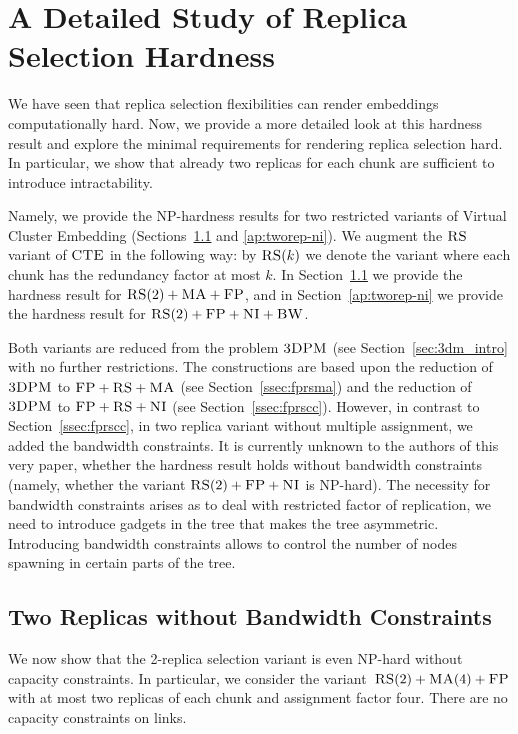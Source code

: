 \section{A Detailed Study of Replica Selection Hardness}\label{ap:tworep}
We have seen that replica selection flexibilities can render embeddings computationally hard.
Now, we provide a more detailed look at this hardness result
and explore the minimal requirements for rendering replica selection hard.
In particular, we show that already two replicas for each chunk are sufficient to
introduce intractability.

Namely, we provide the NP-hardness results for two restricted variants of Virtual Cluster Embedding (Sections~\ref{ap:tworep-ma} and \ref{ap:tworep-ni}).
We augment the $\textsc{RS}$ variant of $\textsc{CTE}$ in the following way: by $\textsc{RS}(k)$ we denote the variant where each chunk has the redundancy factor at most $k$.
In Section~\ref{ap:tworep-ma} we provide the hardness result for $\textsc{RS}(2)+\textsc{MA}+\textsc{FP}$, and in Section~\ref{ap:tworep-ni} we provide the hardness result for $\textsc{RS}(2)+\textsc{FP}+\textsc{NI}+\textsc{BW}$.

Both variants are reduced from the problem $\textsc{3DPM}$ (see Section~\ref{sec:3dm_intro} with no further restrictions.
The constructions are based upon the reduction of $\textsc{3DPM}$ to $\textsc{FP}+\textsc{RS}+\textsc{MA}$ (see Section~\ref{ssec:fprsma}) and the reduction of $\textsc{3DPM}$ to $\textsc{FP}+\textsc{RS}+\textsc{NI}$ (see Section~\ref{ssec:fprscc}).
However, in contrast to Section~\ref{ssec:fprscc}, in two replica variant without multiple assignment, we added the bandwidth constraints.
It is currently unknown to the authors of this very paper, whether the hardness result holds without bandwidth constraints (namely, whether the variant $\textsc{RS}(2)+\textsc{FP}+\textsc{NI}$ is NP-hard).
The necessity for bandwidth constraints arises as to deal with restricted factor of replication, we need to introduce gadgets in the tree that makes the tree asymmetric.
Introducing bandwidth constraints allows to control the number of nodes spawning in certain parts of the tree.

\subsection{Two Replicas without Bandwidth Constraints}\label{ap:tworep-ma}

We now show that the 2-replica selection variant is even NP-hard
without capacity constraints.  In particular, we consider the 
variant~$\textsc{RS}(2)+\textsc{MA}(4)+\textsc{FP}$ with at most two replicas of each chunk and assignment factor
four. There are no capacity constraints on links.

